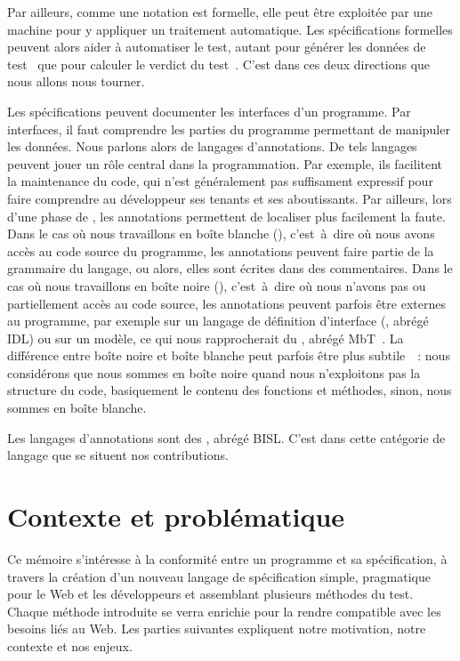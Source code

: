 Par ailleurs, comme une notation est formelle, elle peut être exploitée par une
machine pour y appliquer un traitement automatique. Les spécifications
formelles peuvent alors aider à {\strong automatiser le test}, autant pour
générer les données de test~
que pour calculer le verdict du test~. C'est dans ces deux
directions que nous allons nous tourner.

Les spécifications peuvent documenter les {\strong interfaces} d'un programme.
Par interfaces, il faut comprendre les parties du programme permettant de
manipuler les données. Nous parlons alors de {\strong langages d'annotations}.
De tels langages peuvent jouer un rôle central dans la programmation. Par
exemple, ils facilitent la maintenance du code, qui n'est généralement pas
suffisament expressif pour faire comprendre au développeur ses tenants et ses
aboutissants. Par ailleurs, lors d'une phase de , les
annotations permettent de localiser plus facilement la faute. Dans le cas où
nous travaillons en boîte blanche (), c'est~à~dire où nous
avons accès au code source du programme, les annotations peuvent faire partie de
la grammaire du langage, ou alors, elles sont écrites dans des {\strong
commentaires}. Dans le cas où nous travaillons en boîte noire
(), c'est~à~dire où nous n'avons pas ou partiellement accès
au code source, les annotations peuvent parfois être externes au programme, par
exemple sur un langage de définition d'interface (, abrégé IDL) ou sur un modèle, ce qui nous rapprocherait du
, abrégé MbT~. La différence
entre boîte noire et boîte blanche peut parfois être plus
subtile~~: nous considérons que nous sommes en boîte noire quand
nous n'exploitons pas la structure du code, basiquement le contenu des fonctions
et méthodes, sinon, nous sommes en boîte blanche.

Les langages d'annotations sont des , abrégé BISL. C'est dans cette catégorie de langage que
se situent nos contributions.

\section{Contexte et problématique}

Ce mémoire s'intéresse à la conformité entre un programme et sa spécification, à
travers la création d'un nouveau langage de spécification simple, pragmatique
pour le Web et les développeurs et assemblant plusieurs méthodes du test. Chaque
méthode introduite se verra enrichie pour la rendre compatible avec les besoins
liés au Web. Les parties suivantes expliquent notre motivation, notre contexte
et nos enjeux.

